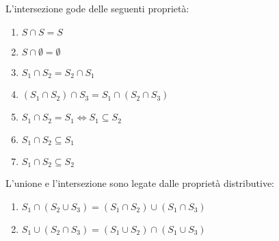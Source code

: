 
L'intersezione gode delle seguenti proprietà:
\begin{prop}
\begin{enumerate}
  \item $S \cap S = S$
  \item $S \cap \emptyset = \emptyset$
  \item $S_1 \cap S_2 = S_2 \cap S_1$
  \item $(S_1 \cap S_2) \cap S_3 = S_1 \cap (S_2 \cap S_3)$
  \item $S_1 \cap S_2 = S_1 \iff S_1 \subseteq S_2$
  \item $S_1 \cap S_2 \subseteq S_1$
  \item $S_1 \cap S_2 \subseteq S_2$
\end{enumerate}
\end{prop}


L'unione e l'intersezione sono legate dalle proprietà distributive:
\begin{enumerate}
  \item $S_1 \cap (S_2 \cup S_3) = (S_1 \cap S_2) \cup (S_1 \cap S_3)$
  \item $S_1 \cup (S_2 \cap S_3) = (S_1 \cup S_2) \cap (S_1 \cup S_3)$
\end{enumerate}

